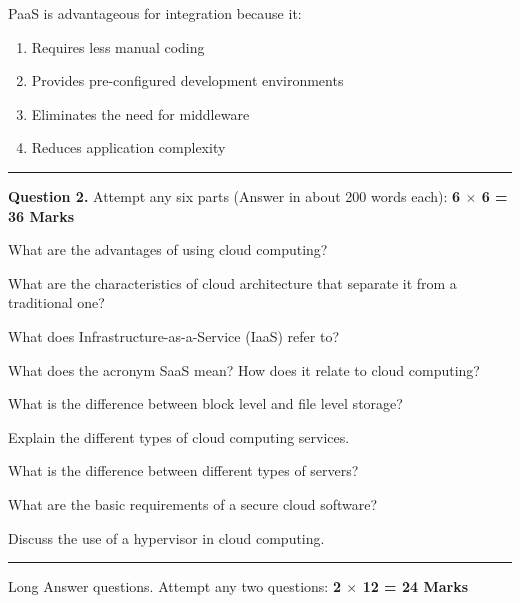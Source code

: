 \documentclass[11pt,a4paper]{article}
\begin{document}
\begin{parts}
  \item PaaS is advantageous for integration because it:
  
\begin{enumerate}[label=(\alph*)]
    \item Requires less manual coding
    \item Provides pre-configured development environments
    \item Eliminates the need for middleware
    \item Reduces application complexity
  \end{enumerate}
\end{parts}

\bigskip


\rule{\linewidth}{0.4pt}\smallskip




\noindent   \textbf{Question 2.} Attempt any six parts (Answer in about 200 words each): \hfill   \textbf{6 $ \times$ 6 = 36 Marks}

\begin{parts}
  \item What are the advantages of using cloud computing?
  \item What are the characteristics of cloud architecture that separate it from a traditional one?
  \item What does Infrastructure-as-a-Service (IaaS) refer to?
  \item What does the acronym SaaS mean? How does it relate to cloud computing?
  \item What is the difference between block level and file level storage?
  \item Explain the different types of cloud computing services.
  \item What is the difference between different types of servers?
  \item What are the basic requirements of a secure cloud software?
  \item Discuss the use of a hypervisor in cloud computing.
\end{parts}

\bigskip


\rule{\linewidth}{0.4pt}\smallskip

Long Answer questions. Attempt any two questions: \hfill   \textbf{2 $ \times$ 12 = 24 Marks}

\medskip
\end{document}
